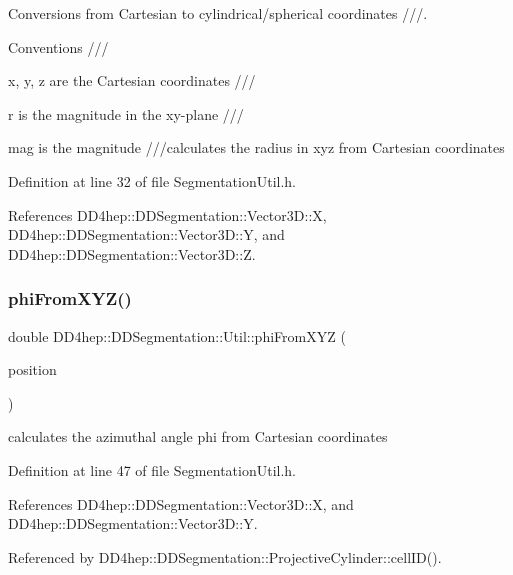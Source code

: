 Conversions from Cartesian to cylindrical/spherical coordinates ///. 

Conventions ///
\begin{DoxyItemize}
\item x, y, z are the Cartesian coordinates ///
\item r is the magnitude in the xy-\/plane ///
\item mag is the magnitude ///calculates the radius in xyz from Cartesian coordinates 
\end{DoxyItemize}

Definition at line 32 of file Segmentation\+Util.\+h.



References D\+D4hep\+::\+D\+D\+Segmentation\+::\+Vector3\+D\+::X, D\+D4hep\+::\+D\+D\+Segmentation\+::\+Vector3\+D\+::Y, and D\+D4hep\+::\+D\+D\+Segmentation\+::\+Vector3\+D\+::Z.

\hypertarget{namespace_d_d4hep_1_1_d_d_segmentation_1_1_util_aa8b3866b06a01bd33c74b6b4d5ff48a7}{}\label{namespace_d_d4hep_1_1_d_d_segmentation_1_1_util_aa8b3866b06a01bd33c74b6b4d5ff48a7} 
\subsubsection{\texorpdfstring{phi\+From\+X\+Y\+Z()}{phiFromXYZ()}}
{\footnotesize\ttfamily double D\+D4hep\+::\+D\+D\+Segmentation\+::\+Util\+::phi\+From\+X\+YZ (\begin{DoxyParamCaption}\item[{const \hyperlink{struct_d_d4hep_1_1_d_d_segmentation_1_1_vector3_d}{Vector3D} \&}]{position }\end{DoxyParamCaption})}



calculates the azimuthal angle phi from Cartesian coordinates 



Definition at line 47 of file Segmentation\+Util.\+h.



References D\+D4hep\+::\+D\+D\+Segmentation\+::\+Vector3\+D\+::X, and D\+D4hep\+::\+D\+D\+Segmentation\+::\+Vector3\+D\+::Y.



Referenced by D\+D4hep\+::\+D\+D\+Segmentation\+::\+Projective\+Cylinder\+::cell\+I\+D().

